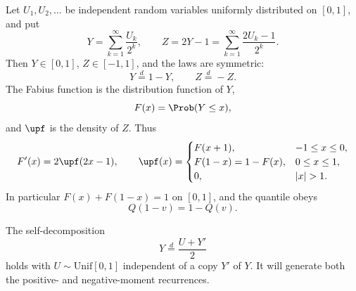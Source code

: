 \documentclass[11pt,oneside]{article}
\theoremstyle{definition}
\theoremstyle{remark}
\newcommand{\F}{F}
\newcommand{\Q}{Q}
\newcommand{\1}{\mathbf 1}
\begin{document}
Let \(U_1,U_2,\ldots\) be independent random variables uniformly distributed on
\([0,1]\), and put
\begin{equation}\label{p4:eq:Ydef}
 Y=\sum_{k=1}^{\infty}\frac{U_k}{2^k},
 \qquad
 Z=2Y-1=\sum_{k=1}^{\infty}\frac{2U_k-1}{2^k}.
\end{equation}
Then \(Y\in[0,1]\), \(Z\in[-1,1]\), and the laws are symmetric:
\begin{equation}\label{p4:eq:symmetry-laws}
 Y\overset d=1-Y,
 \qquad Z\overset d=-Z.
\end{equation}
The Fabius function is the distribution function of \(Y\),
\begin{equation}\label{p4:eq:Fdist}
 \F(x)=\Prob(Y\le x),
\end{equation}
and \(\upf\) is the density of \(Z\).  Thus
\begin{equation}\label{p4:eq:F-up-relations}
 \F'(x)=2\upf(2x-1),\qquad
 \upf(x)=
 \begin{cases}
   \F(x+1),&-1\le x\le0,\\
   \F(1-x)=1-\F(x),&0\le x\le1,\\
   0,&|x|>1.
 \end{cases}
\end{equation}
In particular \(\F(x)+\F(1-x)=1\) on \([0,1]\), and the quantile obeys
\begin{equation}\label{p4:eq:Qsymmetry}
 \Q(1-v)=1-\Q(v).
\end{equation}

The self-decomposition
\begin{equation}\label{p4:eq:smoothing}
 Y\overset d=\frac{U+Y'}2
\end{equation}
holds with \(U\sim\mathrm{Unif}[0,1]\) independent of a copy \(Y'\) of \(Y\).
It will generate both the positive- and negative-moment recurrences.
\end{document}
